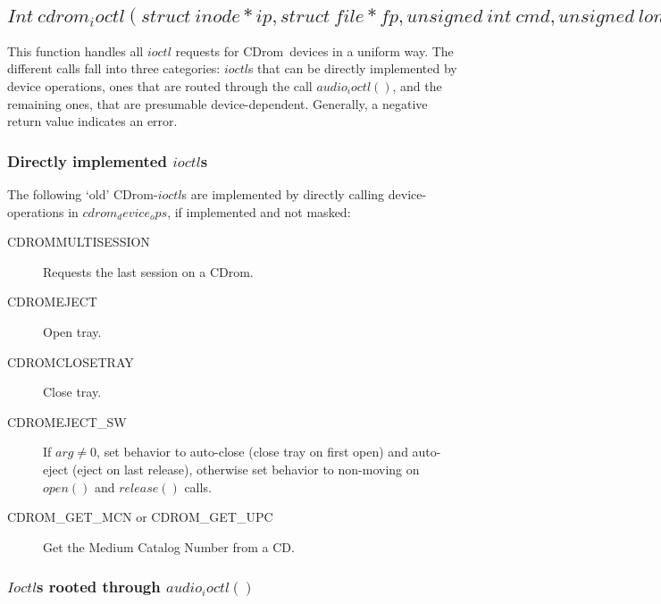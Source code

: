 \documentclass{article}
\def\cdrom{{\sc CDrom}}
\begin{document}
\subsection{$Int\ cdrom_ioctl(struct\ inode *ip, struct\ file *fp,
                       unsigned\ int\ cmd, unsigned\ long\ arg)$}
\label{cdrom-ioctl}

This function handles all $ioctl$ requests for \cdrom\ devices in a
uniform way. The different calls fall into three categories: $ioctl$s
that can be directly implemented by device operations, ones that are
routed through the call $audio_ioctl()$, and the remaining ones, that
are presumable device-dependent. Generally, a negative return value
indicates an error. 

\subsubsection{Directly implemented $ioctl$s}
\label{ioctl-direct}

The following `old' \cdrom-$ioctl$s are implemented by directly
calling device-operations in $cdrom_device_ops$, if implemented and
not masked:
\begin{description}
\item[CDROMMULTISESSION] Requests the last session on a \cdrom.
\item[CDROMEJECT] Open tray. 
\item[CDROMCLOSETRAY] Close tray.
\item[CDROMEJECT_SW] If $arg\not=0$, set behavior to auto-close (close
tray on first open) and auto-eject (eject on last release), otherwise
set behavior to non-moving on $open()$ and $release()$ calls.
\item[CDROM_GET_MCN or CDROM_GET_UPC] Get the Medium Catalog Number from a CD.
\end{description}

\subsubsection{$Ioctl$s rooted through $audio_ioctl()$}
\label{ioctl-audio}
\end{document}
